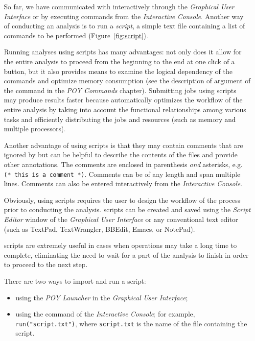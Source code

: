 {So far, we have communicated with \poy interactively through the \emph{Graphical User Interface} or by executing 
commands from the \emph{Interactive Console}. Another way of conducting an analysis is to run a \emph{script}, a 
simple text file containing a list of commands to be performed (Figure~\ref{fig:script}). 

Running analyses using scripts has many advantages: not only does it allow for the entire analysis to proceed from 
the beginning to the end at one click of a button, but it also provides means to examine the logical dependency of the 
commands and optimize memory consumption (see the description of  argument of the 
command  in the \emph{POY Commands} chapter). Submitting jobs using scripts may produce 
results faster because \poy automatically optimizes the workflow of the entire analysis by taking into account the
 functional relationships among various tasks and efficiently distributing the jobs and resources (such as memory 
 and multiple processors).

Another advantage of using scripts is that they may contain comments that are ignored by \poy but can be helpful 
to describe the contents of the files and provide other annotations. The comments are enclosed in parenthesis 
\emph{and} asterisks, e.g. \texttt{(* this is a comment *)}. Comments can be of any length and span multiple 
lines. Comments can also be entered interactively from the \emph{Interactive Console}.

Obviously, using scripts requires the user to design the workflow of the process prior to conducting the analysis. 
\poy scripts can be created and saved using the \emph{Script Editor} window of the \poy \emph{Graphical User Interface} 
or any conventional text editor (such as TextPad, TextWrangler, BBEdit, Emacs, or NotePad).

\poy scripts are extremely useful in cases when operations may take a long time to complete, eliminating the need to wait 
for a part of the analysis to finish in order to proceed to the next step.

There are two ways to import and run a script:
\begin{itemize}
    \item using the \emph{POY Launcher} in the \emph{Graphical User Interface};
    \item using the command  of the \emph{Interactive Console}; for example, \texttt{run("script.txt")}, 
    where \texttt{script.txt} is the name of the file containing the script.
\end{itemize}

}

